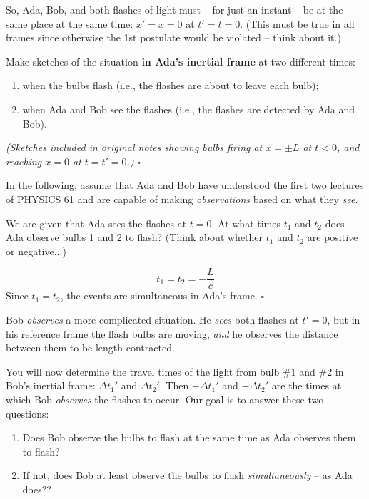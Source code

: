 \documentclass[11pt, letterpaper, openany]{book}
\newenvironment{exercise}[1][Exercise]{%
  \tcolorbox[blanker, breakable, left=1em,
    before skip=1em, after skip=1em,
    borderline west={3pt}{0pt}{PhysNavy},
    colback=PhysCream,
    before upper={\textcolor{PhysNavy}{\sffamily\bfseries #1:}\space}
  ]%
}{%
  \endtcolorbox%
}
\newenvironment{solution}[1][Solution]{%
  \tcolorbox[blanker, breakable, left=1em,
    before skip=1em, after skip=1em,
    borderline west={2pt}{0pt}{PhysTeal},
    colback=PhysCream,
    before upper={\textcolor{PhysTeal}{\sffamily\bfseries #1.}\space}
  ]%
}{%
  \hfill\textcolor{PhysTeal}{\ensuremath{\square}}\endtcolorbox%
}
\begin{document}
So, Ada, Bob, and both flashes of light must -- for just an instant -- be at the same place at the same time: $x'=x=0$ at $t'=t=0$. (This must be true in all frames since otherwise the 1st postulate would be violated -- think about it.)

\begin{exercise}[Exercise 6]
Make sketches of the situation \textbf{in Ada's inertial frame} at two different times:
\begin{enumerate}[label=\alph*.]
    \item when the bulbs flash (i.e., the flashes are about to leave each bulb);
    \item when Ada and Bob see the flashes (i.e., the flashes are detected by Ada and Bob).
\end{enumerate}
\end{exercise}
\begin{solution}
\textit{(Sketches included in original notes showing bulbs firing at $x=\pm L$ at $t < 0$, and reaching $x=0$ at $t=t'=0$.)}
\end{solution}

In the following, assume that Ada and Bob have understood the first two lectures of PHYSICS 61 and are capable of making \textit{observations} based on what they \textit{see}.

\begin{exercise}[Exercise 7]
We are given that Ada sees the flashes at $t=0$. At what times $t_1$ and $t_2$ does Ada observe bulbs 1 and 2 to flash? (Think about whether $t_1$ and $t_2$ are positive or negative...)
\end{exercise}
\begin{solution}
\[ t_1 = t_2 = -\frac{L}{c} \]
Since $t_1 = t_2$, the events are simultaneous in Ada's frame.
\end{solution}

Bob \textit{observes} a more complicated situation. He \textit{sees} both flashes at $t'=0$, but in his reference frame the flash bulbs are moving, \textit{and} he observes the distance between them to be length-contracted.

You will now determine the travel times of the light from bulb \#1 and \#2 in Bob's inertial frame: $\Delta t_1'$ and $\Delta t_2'$. Then $-\Delta t_1'$ and $-\Delta t_2'$ are the times at which Bob \textit{observes} the flashes to occur. Our goal is to answer these two questions:
\begin{enumerate}[label=\roman*.]
    \item Does Bob observe the bulbs to flash at the same time as Ada observes them to flash?
    \item If not, does Bob at least observe the bulbs to flash \textit{simultaneously} -- as Ada does??
\end{enumerate}
\end{document}
